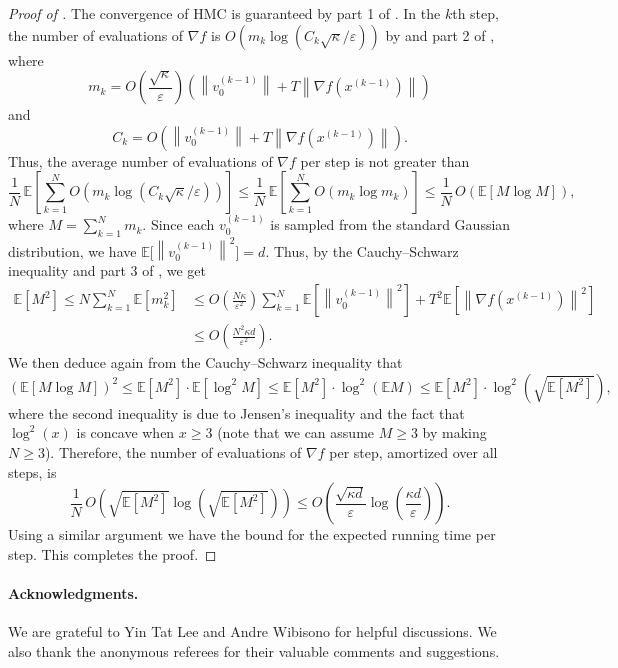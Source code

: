 \documentclass{toc}
\newcommand{\Exp}{\mathbb{E}}
\newcommand{\norm}[1]{\left\lVert #1 \right\rVert}
\newcommand{\grad}{\nabla}
\newcommand{\eps}{\varepsilon}
\begin{document}
\begin{proof}[Proof of ]
	The convergence of HMC is guaranteed by part 1 of . In the $k$th step, the number of evaluations of $\grad f$ is $O(m_k \log (C_k \sqrt{\kappa}/\eps))$ by  and part 2 of , where
	\[
	m_k = O\left( \frac{\sqrt{\kappa}}{\eps}\right) \left( \norm{v_0^{(k-1)}} + T\norm{\grad f(x^{(k-1)})}  \right) 
	\]
	and
	\[
	C_k = O\left( \norm{v_0^{(k-1)}} + T\norm{\grad f(x^{(k-1)})} \right).
	\]
Thus, the average number of evaluations of $\grad f$ per step is
%
not greater than  %
	\[
	\frac{1}{N}\, \Exp \left[ \sum_{k=1}^N O(m_k \log (C_k \sqrt{\kappa}/\eps)) \right] \le \frac{1}{N}\, \Exp \left[ \sum_{k=1}^N O(m_k \log m_k) \right]
	\le \frac{1}{N} \, O\left( \Exp \left[ M \log M \right] \right),
	\]
	where $M = \sum_{k=1}^N m_k$. Since each $v_0^{(k-1)}$ is sampled from the standard Gaussian distribution, we have $\Exp \Big[ \norm{v_0^{(k-1)}}^2 \Big] = d$. Thus, by the Cauchy--Schwarz inequality and part 3 of , we get
	\begin{align*}
		\Exp\left[ M^2 \right] \le N \sum_{k=1}^N \Exp\left[ m_k^2 \right] 
		&\le O\left( \frac{N\kappa}{\eps^2} \right) \sum_{k=1}^N \Exp\left[ \norm{v_0^{(k-1)}}^2 \right] + T^2 \Exp\left[ \norm{\grad f(x^{(k-1)})}^2 \right]\\ 
		&\le O\left( \frac{N^2\kappa d}{\eps^2} \right).
	\end{align*}
	We then deduce again from the Cauchy--Schwarz inequality that
	\[
	\left(\Exp[M \log M]\right)^2 \le \Exp\left[M^2\right] \cdot \Exp\left[\log^2 M\right] \le \Exp\left[ M^2 \right] \cdot \log^2\left( \Exp M \right) 
	\le \Exp[M^2] \cdot \log^2\left( \sqrt{\Exp\left[ M^2 \right]} \right), 
	\]
	where the second inequality is due to Jensen's inequality and the fact that $\log^2(x)$ is concave when $x \geq 3$ (note that we can assume $M \ge 3$ by making $N \ge 3$). 
	Therefore, the number of evaluations of $\grad f$ per step, amortized over all steps, is 
	\[
	\frac{1}{N}\, O\left( \sqrt{\Exp[M^2]}  \log\left( \sqrt{\Exp\left[ M^2 \right]} \right) \right) \le O\left( \frac{\sqrt{\kappa d}}{\eps} \log\left( \frac{\kappa d}{\eps} \right) \right).
	\]
	Using a similar argument we have the bound for the expected running time per step. This completes the proof.
\end{proof}

\paragraph{Acknowledgments.} We are grateful to Yin Tat Lee and Andre Wibisono for helpful discussions. 
We also thank the anonymous referees for their valuable comments and suggestions. 
\end{document}
